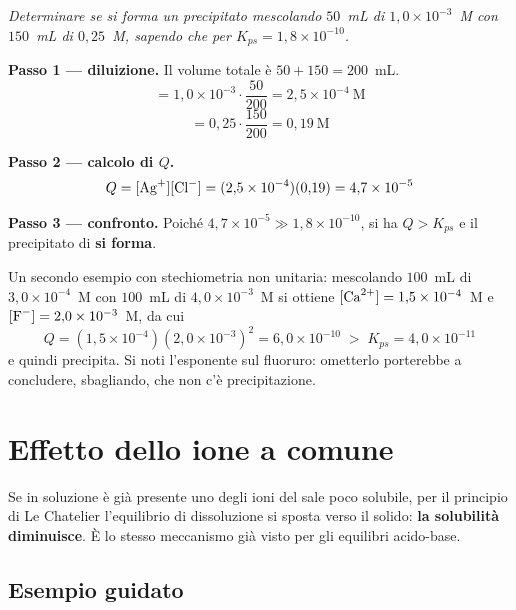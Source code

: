 \documentclass[11pt, a4paper, openright]{book}
\begin{document}
\emph{Determinare se si forma un precipitato mescolando $50$~mL di 
$1{,}0 \times 10^{-3}$~M con $150$~mL di  $0{,}25$~M, sapendo che per 
$K_{ps} = 1{,}8 \times 10^{-10}$.}

\medskip
\noindent\textbf{Passo 1 --- diluizione.} Il volume totale è $50 + 150 = 200$~mL.
\begin{equation*}
  [\ce{Ag+}] = 1{,}0 \times 10^{-3} \cdot \frac{50}{200} = 2{,}5 \times 10^{-4} \ \text{M}
\end{equation*}
\begin{equation*}
  [\ce{Cl-}] = 0{,}25 \cdot \frac{150}{200} = 0{,}19 \ \text{M}
\end{equation*}

\noindent\textbf{Passo 2 --- calcolo di $Q$.}
\begin{equation*}
  Q = [\ce{Ag+}][\ce{Cl-}] = (2{,}5 \times 10^{-4})(0{,}19) = 4{,}7 \times 10^{-5}
\end{equation*}

\noindent\textbf{Passo 3 --- confronto.} Poiché
$4{,}7 \times 10^{-5} \gg 1{,}8 \times 10^{-10}$, si ha $Q > K_{ps}$ e il precipitato di
 \textbf{si forma}.

\medskip
\noindent Un secondo esempio con stechiometria non unitaria: mescolando $100$~mL di
 $3{,}0 \times 10^{-4}$~M con $100$~mL di  $4{,}0 \times 10^{-3}$~M si
ottiene $[\ce{Ca^2+}] = 1{,}5 \times 10^{-4}$~M e $[\ce{F-}] = 2{,}0 \times 10^{-3}$~M,
da cui
\begin{equation*}
  Q = (1{,}5 \times 10^{-4})(2{,}0 \times 10^{-3})^2 = 6{,}0 \times 10^{-10}
  \; > \; K_{ps} = 4{,}0 \times 10^{-11}
\end{equation*}
e quindi  precipita. Si noti l'esponente sul fluoruro: ometterlo porterebbe a
concludere, sbagliando, che non c'è precipitazione.


\section{Effetto dello ione a comune}

Se in soluzione è già presente uno degli ioni del sale poco solubile, per il principio di
Le Chatelier l'equilibrio di dissoluzione si sposta verso il solido: \textbf{la solubilità
diminuisce}. È lo stesso meccanismo già visto per gli equilibri acido-base.

\subsection{Esempio guidato}
\end{document}
